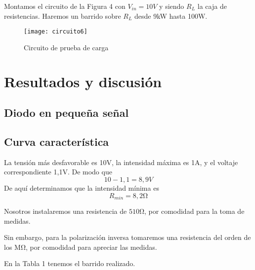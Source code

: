 \documentclass[a4paper,12pt,spanish]{article}
\begin{document}
Montamos el circuito de la Figura 4 con $V_{in}= 10\si{V}$ y siendo $R_L$ la caja de resistencias. Haremos un barrido sobre $R_L$ desde 9kW hasta 100W.

\begin{figure}[H]
	\centering
	\texttt{[image: circuito6]}
	\caption{Circuito de prueba de carga}
	\label{fig:circuito6}
\end{figure}




\section{Resultados y discusión}


\subsection{Diodo en pequeña señal}

\subsection*{Curva característica}

La tensión más desfavorable es 10V, la intensidad máxima es 1A, y el voltaje correspondiente 1,1V. De modo que 
\[ 10 - 1,1 = 8,9 \si{V} \]
De aquí determinamos que la intensidad mínima es 
\[R_{min}= 8,2 \si{\ohm}\]

Nosotros instalaremos una resistencia de $510\si{\ohm}$, por comodidad para la toma de medidas.

Sin embargo, para la polarización inversa tomaremos una resistencia del orden de los $\si{\mega \ohm}$, por comodidad para apreciar las medidas.

En la Tabla 1 tenemos el barrido realizado.
\end{document}
